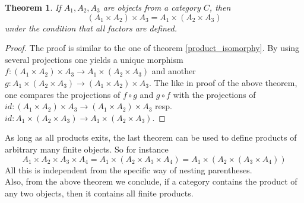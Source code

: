 \documentclass[17pt]{extarticle}
\newtheorem{theorem}{Theorem}
\begin{document}
\begin{theorem}
	If $A_1, A_2, A_3$ are objects from a category $C$, then
	$$(A_1\times A_2)\times A_3=A_1\times (A_2\times A_3)$$
	under the condition that all factors are defined.
\end{theorem}
\begin{proof}
	The proof is similar to the one of theorem \ref{product_isomorphy}. By using
	several projections one yields a unique morphism $f:(A_1\times A_2)\times A_3\rightarrow A_1\times (A_2\times A_3)$ and another $g:A_1\times (A_2\times A_3)\rightarrow  (A_1\times A_2)\times A_3$. The like in proof of the above theorem, one compares the projections of $f\circ g$ and $g\circ f$ with the projections of $id:(A_1\times A_2)\times A_3\rightarrow (A_1\times A_2)\times A_3$ resp. $id:A_1\times (A_2\times A_3)\rightarrow A_1\times (A_2\times A_3)$.
\end{proof}
\leavevmode\newline
As long as all products exits, the last theorem can be used to define products of arbitrary many finite objects. So for instance 
$$A_1\times A_2\times A_3\times A_4=A_1\times (A_2\times A_3\times A_4)=
A_1\times (A_2\times (A_3\times A_4))$$
All this is independent from the specific way of nesting parentheses.\\
Also, from the above theorem we conclude, if a category contains the product of any two objects, then
it contains all finite products.
\end{document}
